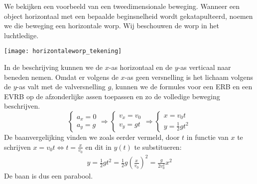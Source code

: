 \documentclass{ximera}
\begin{document}
	\author{Bart Lambregs}
    \xmsource\xmuitleg

We bekijken een voorbeeld van een tweedimensionale beweging. Wanneer een object horizontaal met een bepaalde beginsnelheid wordt gekatapulteerd, noemen we die beweging een horizontale worp. Wij beschouwen de worp in het luchtledige.
\begin{image}
	\texttt{[image: horizontaleworp\_tekening]}
\end{image}

In de beschrijving kunnen we de $x$-as horizontaal en de $y$-as verticaal naar beneden nemen. Omdat er volgens de $x$-as geen versnelling is het lichaam volgens de $y$-as valt met de valversnelling $g$, kunnen we de formules voor een ERB en een EVRB op de afzonderlijke assen toepassen en zo de volledige beweging beschrijven.
\begin{equation*}
	\left\{
	\begin{array}{l}
	a_x=0\\
	a_y=g
	\end{array}
	\right.
	\Rightarrow
	\left\{
	\begin{array}{l}
	v_x=v_0\\
	v_y=gt
	\end{array}
	\right.
	\Rightarrow
	\left\{
	\begin{array}{l}
	x=v_0t\\
	y=\frac{1}{2}gt^2
	\end{array}
	\right.
\end{equation*}
De baanvergelijking vinden we zoals eerder vermeld, door $t$ in functie van $x$ te schrijven $x=v_0t\Leftrightarrow t=\frac{x}{v_0}$ en dit in $y(t)$ te substitueren:
\begin{eqnarray*}
	y=\frac{1}{2}gt^2=\frac{1}{2}g\left(\frac{x}{v_0}\right)^2=\frac{g}{2v_0^2}x^2
\end{eqnarray*}
De baan is dus een parabool.
\end{document}
